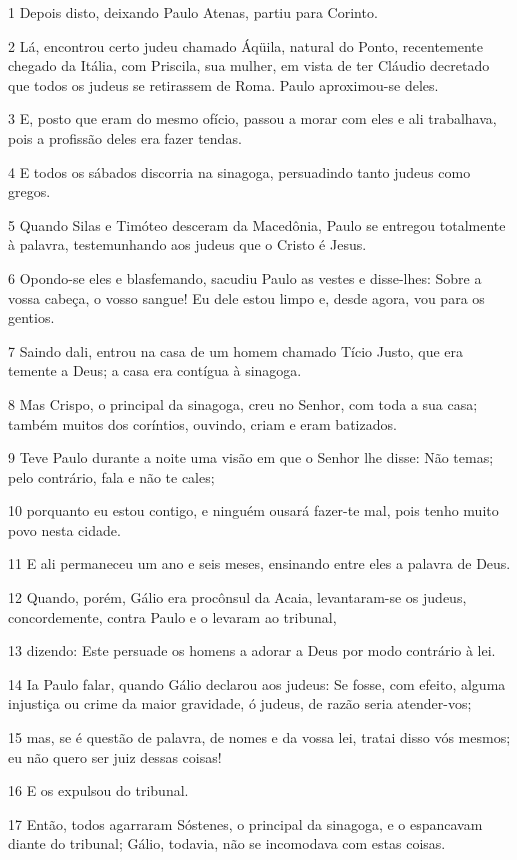 \par 1 Depois disto, deixando Paulo Atenas, partiu para Corinto.
\par 2 Lá, encontrou certo judeu chamado Áqüila, natural do Ponto, recentemente chegado da Itália, com Priscila, sua mulher, em vista de ter Cláudio decretado que todos os judeus se retirassem de Roma. Paulo aproximou-se deles.
\par 3 E, posto que eram do mesmo ofício, passou a morar com eles e ali trabalhava, pois a profissão deles era fazer tendas.
\par 4 E todos os sábados discorria na sinagoga, persuadindo tanto judeus como gregos.
\par 5 Quando Silas e Timóteo desceram da Macedônia, Paulo se entregou totalmente à palavra, testemunhando aos judeus que o Cristo é Jesus.
\par 6 Opondo-se eles e blasfemando, sacudiu Paulo as vestes e disse-lhes: Sobre a vossa cabeça, o vosso sangue! Eu dele estou limpo e, desde agora, vou para os gentios.
\par 7 Saindo dali, entrou na casa de um homem chamado Tício Justo, que era temente a Deus; a casa era contígua à sinagoga.
\par 8 Mas Crispo, o principal da sinagoga, creu no Senhor, com toda a sua casa; também muitos dos coríntios, ouvindo, criam e eram batizados.
\par 9 Teve Paulo durante a noite uma visão em que o Senhor lhe disse: Não temas; pelo contrário, fala e não te cales;
\par 10 porquanto eu estou contigo, e ninguém ousará fazer-te mal, pois tenho muito povo nesta cidade.
\par 11 E ali permaneceu um ano e seis meses, ensinando entre eles a palavra de Deus.
\par 12 Quando, porém, Gálio era procônsul da Acaia, levantaram-se os judeus, concordemente, contra Paulo e o levaram ao tribunal,
\par 13 dizendo: Este persuade os homens a adorar a Deus por modo contrário à lei.
\par 14 Ia Paulo falar, quando Gálio declarou aos judeus: Se fosse, com efeito, alguma injustiça ou crime da maior gravidade, ó judeus, de razão seria atender-vos;
\par 15 mas, se é questão de palavra, de nomes e da vossa lei, tratai disso vós mesmos; eu não quero ser juiz dessas coisas!
\par 16 E os expulsou do tribunal.
\par 17 Então, todos agarraram Sóstenes, o principal da sinagoga, e o espancavam diante do tribunal; Gálio, todavia, não se incomodava com estas coisas.
